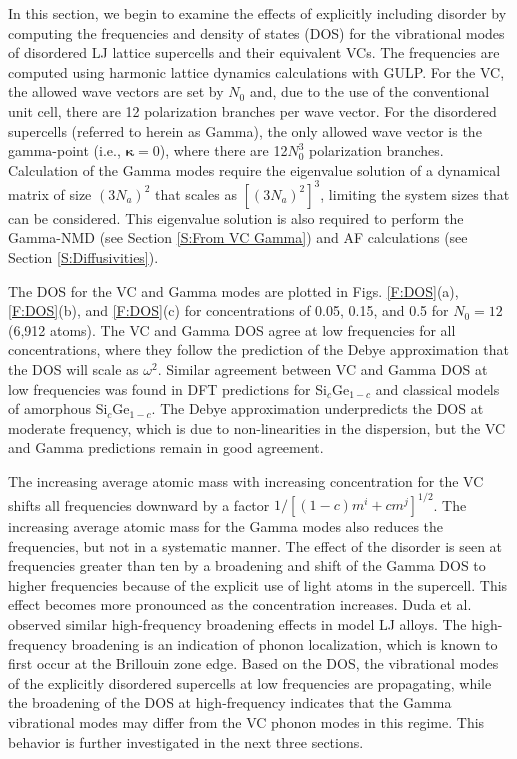 \documentclass[aps,prb,onecolumn,preprint,footinbib,superscriptaddress,amsmath,amssymb,floatfix]{revtex4}
\begin{document}
In this section, we begin to examine the effects of explicitly including 
disorder by computing the frequencies and density of states (DOS)  
for the vibrational modes of disordered LJ lattice supercells and their 
equivalent VCs. The frequencies 
are computed using harmonic lattice dynamics calculations with  
GULP.\cite{gale_general_2003}  For the 
VC, the allowed wave vectors are set by $N_0$ and, due to the use of the 
conventional unit cell, there are 12 
polarization branches per wave vector.  
For the disordered supercells (referred to herein as Gamma),
the only allowed wave vector is the gamma-point (i.e., $\pmb{\kappa}=0$),  
where there are 12$N_0^3$ polarization branches. Calculation of the 
Gamma modes require the eigenvalue solution of a dynamical matrix of size 
$(3N_a)^2$ that scales as $[(3N_a)^2]^3$, limiting the system 
sizes that can be considered. This eigenvalue solution is also 
required to perform the Gamma-NMD (see Section \ref{S:From VC Gamma})  
and AF calculations (see Section \ref{S:Diffusivities}). 

The DOS for the VC and Gamma modes are plotted in Figs. \ref{F:DOS}(a), 
\ref{F:DOS}(b), and \ref{F:DOS}(c) 
for concentrations of 0.05, 0.15, and 0.5 for 
$N_0=12$ (6,912 atoms). The VC and Gamma DOS 
agree at low frequencies for all concentrations, 
where they follow the prediction of the Debye approximation that 
the DOS will scale as $\omega^2$.\cite{ashcroft_solid_1976} 
Similar agreement between VC and Gamma DOS at low frequencies 
was found in DFT predictions 
for Si$_c$Ge$_{1-c}$\cite{garg_role_2011} and 
classical models of amorphous Si$_c$Ge$_{1-c}$.
\cite{bouchard_vibrational_1988} The Debye approximation 
underpredicts the DOS at moderate frequency, which is due to 
non-linearities in the dispersion,\cite{ashcroft_solid_1976} but the 
VC and Gamma predictions remain in good agreement. 

The increasing average atomic  
mass with increasing concentration for the VC shifts all   
frequencies downward by a factor $1/[(1-c)m^i + cm^j]^{1/2}$. 
The increasing average atomic 
mass for the Gamma modes also reduces the frequencies, but not in a 
systematic manner. 
The effect of the disorder is seen at frequencies greater than 
ten by a broadening and shift of the Gamma DOS to higher frequencies 
because of the explicit use of light atoms in the supercell. This effect 
becomes more pronounced as the concentration increases.  
Duda et al. 
observed similar high-frequency broadening effects in model LJ alloys.
\cite{duda_reducing_2011} The high-frequency broadening is an indication 
of phonon localization, which is known to first occur at the 
Brillouin zone edge.\cite{chu_effect_1989} 
Based on the DOS, the vibrational modes of the explicitly disordered 
supercells at low frequencies are {\color{red}propagating}, while the 
broadening of the DOS at high-frequency indicates that the Gamma 
vibrational modes may differ from the VC phonon modes in this regime. 
This behavior is further investigated in the next three sections. 
\end{document}
